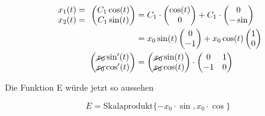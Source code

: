\documentclass[ngerman,a4paper]{scrartcl}
\begin{document}
\begin{align*}
  \begin{array}{c}
    x_1(t) =\\
    x_2(t) =
  \end{array}
  \begin{pmatrix}
    C_1 \cos(t)\\
    C_1 \sin(t)
  \end{pmatrix}
&= C_1 \cdot
\begin{pmatrix}
  \cos(t)\\ 0
\end{pmatrix} + C_1 \cdot
\begin{pmatrix}
  0\\ -\sin
\end{pmatrix}\\
&= x_0 \sin(t)
\begin{pmatrix}
  0\\ -1
\end{pmatrix} + x_0 \cos(t)
\begin{pmatrix}
  1\\ 0
\end{pmatrix}\\
\begin{pmatrix}
  \cancel{x_0} \sin'(t)\\ \cancel{x_0} \cos'(t)
\end{pmatrix} &=
\begin{pmatrix}
  \cancel{x_0} \sin(t)\\ \cancel{x_0} \cos(t)
\end{pmatrix} \cdot
\begin{pmatrix}
  0 & 1\\-1 & 0
\end{pmatrix}
\end{align*}

Die Funktion E würde jetzt so aussehen

\[
E = \text{Skalaprodukt}\{{-x_0 \cdot \sin, x_0 \cdot \cos}\}
\]
\end{document}
